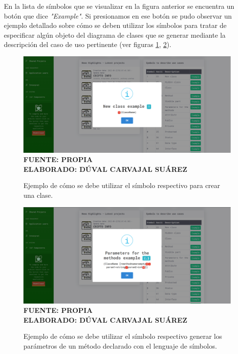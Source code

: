 En la lista de símbolos que se visualizar en la figura anterior se encuentra un botón que dice \textit{"Example"}. Si presionamos en ese botón se pudo observar un ejemplo detallado sobre cómo se deben utilizar los símbolos para tratar de especificar algún objeto del diagrama de clases que se generar mediante la descripción del caso de uso pertinente (ver figuras \ref{fig:ejemploclase}, \ref{fig:ejemploparametro}).

\begin{figure}[H]
	\caption{Ejemplo de cómo se debe utilizar el símbolo respectivo para crear una clase.}
	\includegraphics[width=14cm]{img/res_002.png}
	\label{fig:ejemploclase}
	\textbf{\\ FUENTE: PROPIA \\ ELABORADO: DÚVAL CARVAJAL SUÁREZ}
\end{figure}

\begin{figure}[H]
	\caption{Ejemplo de cómo se debe utilizar el símbolo respectivo generar los parámetros de un método declarado con el lenguaje de símbolos.}
	\includegraphics[width=14cm]{img/res_003.png}
	\label{fig:ejemploparametro}
	\textbf{\\ FUENTE: PROPIA \\ ELABORADO: DÚVAL CARVAJAL SUÁREZ}
\end{figure}

